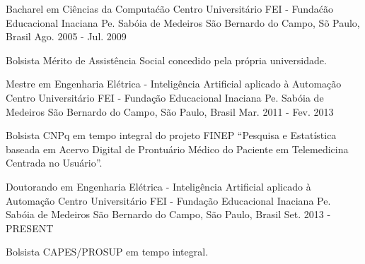 

\begin{cventries}

  \cventry
    {Bacharel em Ci\^encias da Computa\'c\~ao} %
    {Centro Universit\'ario FEI - Funda\'c\~ao Educacional Inaciana Pe. Sab\'oia de Medeiros} %
    {S\~ao Bernardo do Campo, S\~o Paulo, Brasil} %
    {Ago. 2005 - Jul. 2009} %
    {
        \begin{cvitems} %
          \item {Bolsista M\'erito de Assist\^encia Social concedido pela pr\'opria universidade.}
        \end{cvitems}
    }

  \cventry
    {Mestre em Engenharia Elétrica - Inteligência Artificial aplicado à Automação}
    {Centro Universitário FEI - Fundação Educacional Inaciana Pe. Sab\'oia de Medeiros} %
    {São Bernardo do Campo, São Paulo, Brasil} %
    {Mar. 2011 - Fev. 2013}
    {
      \begin{cvitems} %
        \item {Bolsista CNPq em tempo integral do projeto FINEP ``Pesquisa e Estatística baseada em Acervo Digital de Prontuário Médico do Paciente em Telemedicina Centrada no Usuário''.}
      \end{cvitems}
    }

  \cventry
    {Doutorando em Engenharia Elétrica - Inteligência Artificial aplicado à Automação}
    {Centro Universitário FEI - Fundação Educacional Inaciana Pe. Sabóia de Medeiros} %
    {São Bernardo do Campo, São Paulo, Brasil} %
    {Set. 2013 - PRESENT}
    {
      \begin{cvitems} %
        \item {Bolsista CAPES/PROSUP em tempo integral.}
      \end{cvitems}
    }

\end{cventries}

